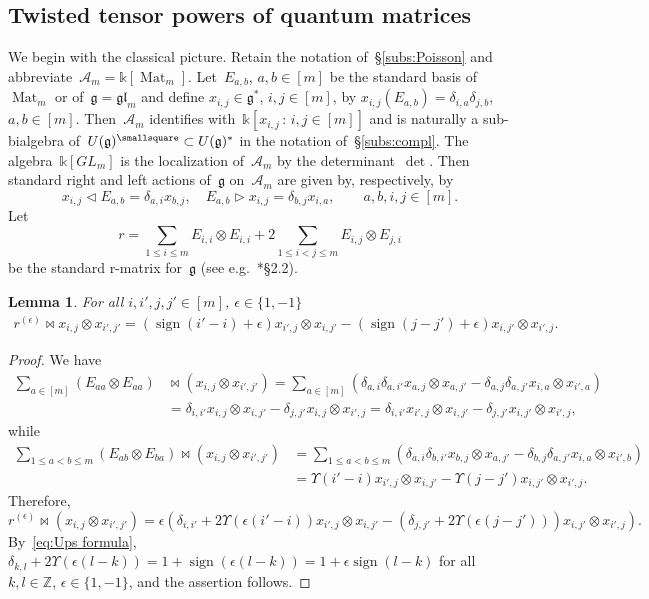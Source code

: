 \documentclass[12pt, reqno]{amsart}
\newtheorem{lemma}[theorem]{Lemma}
\theoremstyle{definition}
\numberwithin{equation}{section}
\newcommand{\tensor}{\otimes}
\newcommand{\kk}{\mathbb{k}}\newcommand{\lie}[1]{{\mathfrak{#1}}}
\newcommand{\ZZ}{{\mathbb Z}}
\DeclareMathOperator{\Mat}{Mat}
\DeclareMathOperator{\sign}{sign}
\begin{document}
\subsection{Twisted tensor powers of quantum matrices}\label{subs:Poisson ex}
\label{subs:twisted tens quantum matrices}
We begin with the classical picture.
Retain the notation of~\S\ref{subs:Poisson}
and abbreviate~$\mathcal A_m=\kk[\Mat_m]$. Let~$E_{a,b}$, $a,b\in [m]$ be 
the standard basis of~$\Mat_m$ or of~$\lie g=\lie{gl}_m$
and define $x_{i,j}\in \lie g^*$, $i,j\in[m]$, by $x_{i,j}(E_{a,b})=
\delta_{i,a}\delta_{j,b}$, $a,b\in [m]$. Then~$\mathcal A_m$ identifies with~$\kk[x_{i,j}\,:\, i,j\in[m]]$
and is naturally a sub-bialgebra of~$U(\lie g)^\smallsquare\subset U(\lie g)^*$ in the notation 
of~\S\ref{subs:compl}.
The algebra~$\kk[GL_m]$ is the localization of~$\mathcal A_m$ by the determinant~$\det$. 
Then standard
right and left actions of~$\lie g$ on~$\mathcal A_m$
are given by, respectively, by
$$
x_{i,j}\triangleleft E_{a,b}=\delta_{a,i} x_{b,j},\quad E_{a,b}\triangleright x_{i,j}=\delta_{b,j}x_{i,a},\qquad a,b,i,j\in [m].
$$
Let
$$
r=\sum_{1\le i\le m} E_{i,i}\tensor E_{i,i}+2\sum_{1\le i<j\le m} E_{i,j}\tensor E_{j,i}
$$
be the standard r-matrix for~$\lie g$ (see e.g.~\cite{CPbook}*{\S2.2}). 
\begin{lemma}\label{lem:r eps acts}
For all $i,i',j,j'\in [m]$, $\epsilon\in\{1,-1\}$
\begin{align*}
r^{(\epsilon)}\bowtie x_{i,j}\tensor x_{i',j'}
=(\sign(i'-i)+\epsilon) x_{i',j}\tensor x_{i,j'}-
(\sign(j-j')+\epsilon)x_{i,j'}\tensor x_{i',j}.
\end{align*}
\end{lemma}
\begin{proof}
We have 
\begin{align*}
\sum_{a\in[m]} (E_{aa}\tensor E_{aa})&\bowtie (x_{i,j}\tensor x_{i',j'})=
\sum_{a\in [m]} (\delta_{a,i}\delta_{a,i'} x_{a,j}\tensor x_{a,j'}
-\delta_{a,j}\delta_{a,j'} x_{i,a}\tensor x_{i',a})\\
&=\delta_{i,i'} x_{i,j}\tensor x_{i,j'}-\delta_{j,j'}x_{i,j}\tensor x_{i',j}
=\delta_{i,i'} x_{i',j}\tensor x_{i,j'}-\delta_{j,j'}x_{i,j'}\tensor x_{i',j},
\end{align*}
while
\begin{align*}
\sum_{1\le a<b\le m} (E_{ab}\tensor E_{ba})\bowtie (x_{i,j}\tensor x_{i',j'})&=
\sum_{1\le a<b\le m} (\delta_{a,i}\delta_{b,i'} x_{b,j}\tensor x_{a,j'}
-\delta_{b,j}\delta_{a,j'} x_{i,a}\tensor x_{i',b})\\ 
&=\Upsilon(i'-i) x_{i',j}\tensor x_{i,j'}-\Upsilon(j-j') x_{i,j'}\tensor x_{i',j}.
\end{align*}
Therefore,
$$
r^{(\epsilon)}\bowtie (x_{i,j}\tensor x_{i',j'})=
\epsilon(\delta_{i,i'}+2\Upsilon(\epsilon(i'-i))x_{i',j}\tensor x_{i,j'}-
(\delta_{j,j'}+2\Upsilon(\epsilon(j-j')))x_{i,j'}\tensor x_{i',j}).
$$
By~\eqref{eq:Ups formula}, $\delta_{k,l}+2\Upsilon(\epsilon(l-k))=1+\sign(\epsilon(l-k))=1+\epsilon\sign(l-k)$
for all $k,l\in\ZZ$, $\epsilon\in\{1,-1\}$, and
the assertion follows.
\end{proof}
\end{document}
